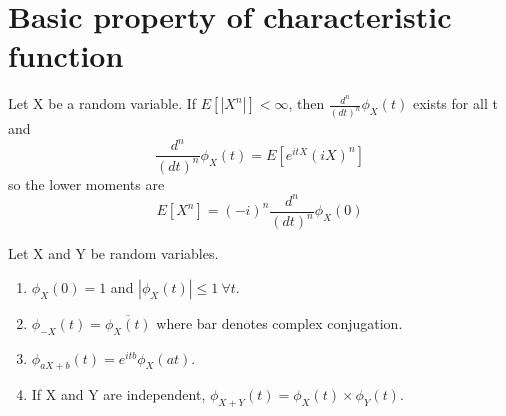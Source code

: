 \documentclass[../Transformation.tex]{subfiles}
\begin{document}
\section{Basic property of characteristic function}
\begin{property}
Let X be a random variable. If $E[|X^n|]<\infty$, then $\frac{d^n}{(dt)^n}\phi_X(t)$ exists for all t and 
$$\frac{d^n}{(dt)^n}\phi_X(t)=E[e^{itX}(iX)^n]$$
so the lower moments are
$$E[X^n]=(-i)^n\frac{d^n}{(dt)^n}\phi_X(0)$$
\end{property}
\begin{property}[Basic]Let X and Y be random variables.
\begin{enumerate}
\item $\phi_X(0)=1$ and $|\phi_X(t)|\leq 1\ \forall t$.
\item $\phi_{-X}(t)=\overline{\phi_X(t)}$ where bar denotes complex conjugation.
\item $\phi_{aX+b}(t)=e^{itb}\phi_X(at)$.
\item If X and Y are independent, $\phi_{X+Y}(t)=\phi_X(t)\times\phi_Y(t)$.
\end{enumerate}
\end{property}
\end{document}
